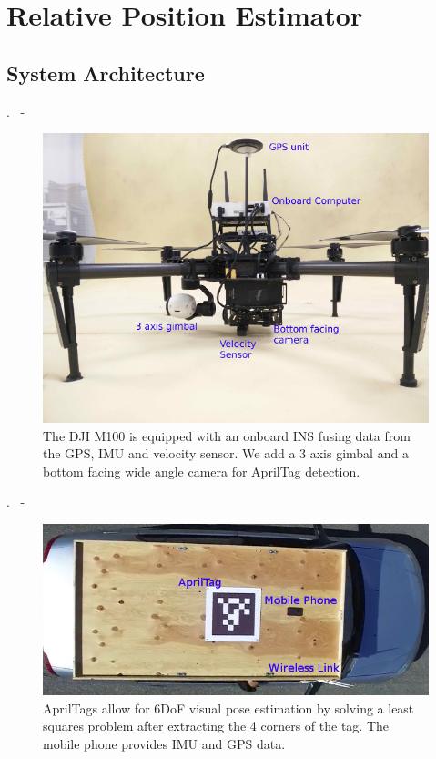 \section{Relative Position Estimator}

\subsection{System Architecture}
\begin{frame}{\thesection. \insertsection \ - \insertsubsection}
	\begin{figure}
		\includegraphics[width=0.6\paperwidth]{figures/m100.jpg}
		\caption{The DJI M100 is equipped with an onboard INS fusing data from
		the GPS, IMU and velocity sensor. We add a 3 axis gimbal and a bottom facing wide angle camera for
		AprilTag detection.}
	\end{figure}
\end{frame}


\begin{frame}{\thesection. \insertsection \ - \insertsubsection}
	\begin{figure}
		\includegraphics[width=0.8\paperwidth]{figures/car.png}
		\caption{AprilTags allow for 6DoF visual pose estimation by solving a least squares problem
	after extracting the 4 corners of the tag. The mobile phone provides IMU and GPS data.}
	\end{figure}
\end{frame}

